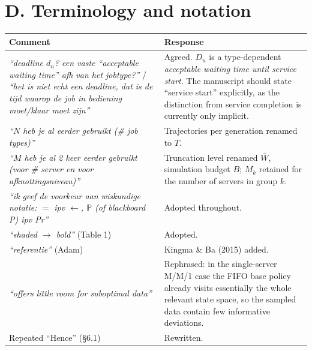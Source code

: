 \documentclass[11pt,a4paper]{article}
\newcommand{\comment}[1]{\textcolor{red!70!black}{\textit{``#1''}}}
\begin{document}
\section*{D. Terminology and notation}

\begin{center}
\begin{tabular}{p{7.4cm}p{7.4cm}}
\toprule
\textbf{Comment} & \textbf{Response} \\
\midrule
\comment{deadline $d_n$? een vaste ``acceptable waiting time'' afh van het
jobtype?} / \comment{het is niet echt een deadline, dat is de tijd waarop de
job in bediening moet/klaar moet zijn}
& Agreed.  $D_n$ is a type-dependent \emph{acceptable waiting time until
service start}.  The manuscript should state ``service start'' explicitly, as
the distinction from service completion is currently only implicit. \\[4pt]
\comment{$N$ heb je al eerder gebruikt (\# job types)}
& Trajectories per generation renamed to $T$. \\[4pt]
\comment{$M$ heb je al 2 keer eerder gebruikt (voor \# server en voor
afknottingsniveau)}
& Truncation level renamed $\bar{W}$, simulation budget $B$; $M_k$ retained for
the number of servers in group $k$. \\[4pt]
\comment{ik geef de voorkeur aan wiskundige notatie: $=$ ipv $\leftarrow$,
$\mathbb{P}$ (of blackboard P) ipv Pr}
& Adopted throughout. \\[4pt]
\comment{shaded $\to$ bold} (Table 1)
& Adopted. \\[4pt]
\comment{referentie} (Adam)
& Kingma \& Ba (2015) added. \\[4pt]
\comment{offers little room for suboptimal data}
& Rephrased: in the single-server M/M/1 case the FIFO base policy already
visits essentially the whole relevant state space, so the sampled data contain
few informative deviations. \\[4pt]
Repeated ``Hence'' (\S6.1)
& Rewritten. \\
\bottomrule
\end{tabular}
\end{center}
\end{document}
